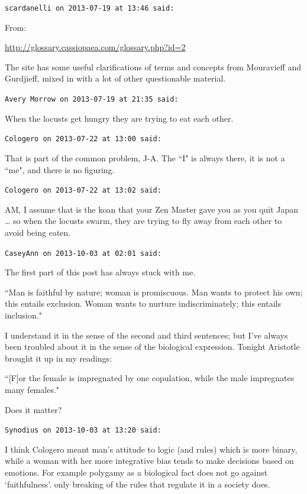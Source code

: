 \begin{footnotesize}
\begin{sffamily}
\hfill

\texttt{scardanelli on 2013-07-19 at 13:46 said: }

From:

\url{http://glossary.cassiopaea.com/glossary.php?id=2}

The site has some useful clarifications of terms and concepts from Mouravieff and Gurdjieff, mixed in with a lot of other questionable material.


\hfill

\texttt{Avery Morrow on 2013-07-19 at 21:35 said: }

When the locusts get hungry they are trying to eat each other.


\hfill

\texttt{Cologero on 2013-07-22 at 13:00 said: }

That is part of the common problem, J-A. The ``I" is always there, it is not a ``me", and there is no figuring.


\hfill

\texttt{Cologero on 2013-07-22 at 13:02 said: }

AM, I assume that is the koan that your Zen Master gave you as you quit Japan … so when the locusts swarm, they are trying to fly away from each other to avoid being eaten.


\hfill

\texttt{CaseyAnn on 2013-10-03 at 02:01 said: }

The first part of this post has always stuck with me.

``Man is faithful by nature; woman is promiscuous. Man wants to protect his own; this entails exclusion. Woman wants to nurture indiscriminately; this entails inclusion."

I understand it in the sense of the second and third sentences; but I've always been troubled about it in the sense of the biological expression. Tonight Aristotle brought it up in my readings:

``[F]or the female is impregnated by one copulation, while the male impregnates many females."

Does it matter?


\hfill

\texttt{Synodius on 2013-10-03 at 13:20 said: }

I think Cologero meant man's attitude to logic (and rules) which is more binary, while a woman with her more integrative bias tends to make decisions based on emotions. For example polygamy as a biological fact does not go against `faithfulness'. only breaking of the rules that regulate it in a society does.


\end{sffamily}\end{footnotesize}
